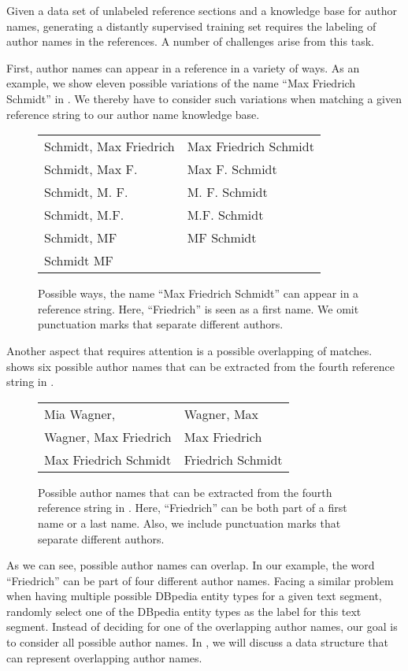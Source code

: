 Given a data set of unlabeled reference sections and a knowledge base for author names, generating a distantly supervised training set requires the labeling of author names in the references.
A number of challenges arise from this task.

First, author names can appear in a reference in a variety of ways.
As an example, we show eleven possible variations of the name ``Max Friedrich Schmidt'' in .
We thereby have to consider such variations when matching a given reference string to our author name knowledge base.
\begin{figure}[t]
\centering
\begin{tabular}{l l}
  \tabitem{}Schmidt, Max Friedrich&\tabitem{}Max Friedrich Schmidt\\
  \tabitem{}Schmidt, Max F.       &\tabitem{}Max F. Schmidt\\
  \tabitem{}Schmidt, M. F.        &\tabitem{}M. F. Schmidt\\
  \tabitem{}Schmidt, M.F.         &\tabitem{}M.F. Schmidt\\
  \tabitem{}Schmidt, MF           &\tabitem{}MF Schmidt\\
  \tabitem{}Schmidt MF            &{}
\end{tabular}
\caption{Possible ways, the name ``Max Friedrich Schmidt'' can appear in a reference string. Here, ``Friedrich'' is seen as a first name. We omit punctuation marks that separate different authors.}
\label{fig:example-name-variations}
\vspace{0.4cm}
\end{figure}

Another aspect that requires attention is a possible overlapping of matches.
 shows six possible author names that can be extracted from the fourth reference string in .
\begin{figure}[t]
\centering
\begin{tabular}{l l}
  \tabitem{}Mia Wagner,          &\tabitem{}Wagner, Max\\
  \tabitem{}Wagner, Max Friedrich&\tabitem{}Max Friedrich\\
  \tabitem{}Max Friedrich Schmidt&\tabitem{}Friedrich Schmidt
\end{tabular}
\caption{Possible author names that can be extracted from the fourth reference string in . Here, ``Friedrich'' can be both part of a first name or a last name. Also, we include punctuation marks that separate different authors.}
\label{fig:ref-4-example-author-names}
\end{figure}
As we can see, possible author names can overlap.
In our example, the word ``Friedrich'' can be part of four different author names.
Facing a similar problem when having multiple possible DBpedia entity types for a given text segment, \citet{lu2013web} randomly select one of the DBpedia entity types as the label for this text segment.
Instead of deciding for one of the overlapping author names, our goal is to consider all possible author names.
In , we will discuss a data structure that can represent overlapping author names.

